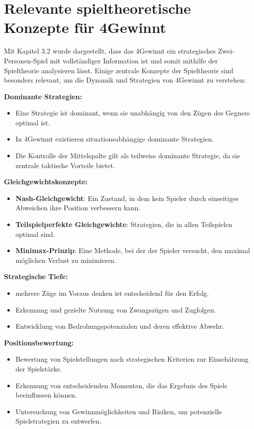 \section{Relevante spieltheoretische Konzepte für 4Gewinnt}
Mit Kapitel 3.2 wurde dargestellt, dass das 4Gewinnt ein strategisches Zwei-Personen-Spiel mit vollständiger Information ist und somit mithilfe der Spieltheorie analysieren lässt. Einige zentrale Konzepte der Spieltheorie sind besonders relevant, um die Dynamik und Strategien von 4Gewinnt zu verstehen:


\textbf{Dominante Strategien:}
\begin{itemize}
	\item Eine Strategie ist dominant, wenn sie unabhängig von den Zügen des Gegners optimal ist.
	\item In 4Gewinnt existieren situationsabhängige dominante Strategien.
	\item Die Kontrolle der Mittelspalte gilt als teilweise dominante Strategie, da sie zentrale taktische Vorteile bietet.
\end{itemize}

\textbf{Gleichgewichtskonzepte:}
\begin{itemize}
	\item \textbf{Nash-Gleichgewicht}: Ein Zustand, in dem kein Spieler durch einseitiges Abweichen ihre Position verbessern kann.

	\item \textbf{Teilspielperfekte Gleichgewichte}: Strategien, die in allen Teilspielen optimal sind.
	\item \textbf{Minimax-Prinzip}: Eine Methode, bei der der Spieler versucht, den maximal möglichen Verlust zu minimieren.
\end{itemize}

\textbf{Strategische Tiefe:}
\begin{itemize}
	\item mehrere Züge im Voraus denken ist entscheidend für den Erfolg.
	\item Erkennung und gezielte Nutzung von Zwangszügen und Zugfolgen.
	\item Entwicklung von Bedrohungspotenzialen und deren effektive Abwehr.
\end{itemize}

\textbf{Positionsbewertung:}
\begin{itemize}
	\item Bewertung von Spielstellungen nach strategischen Kriterien zur Einschätzung der Spielstärke.
	\item Erkennung von entscheidenden Momenten, die das Ergebnis des Spiels beeinflussen können.
	\item Untersuchung von Gewinnmöglichkeiten und Risiken, um potenzielle Spielstrategien zu entwerfen.
\end{itemize}

